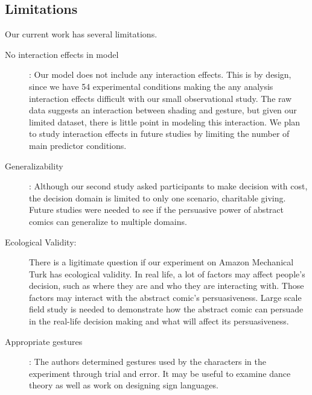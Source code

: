 \subsection{Limitations}
Our current work has several limitations.
\begin{description}
 \item[No interaction effects in model]: Our model does not include any interaction effects. This is by design, since we have 54 experimental conditions making the any analysis interaction effects difficult with our small observational study. The raw data suggests an interaction between shading and gesture, but given our limited dataset, there is little point in modeling this interaction. We plan to study interaction effects in future studies by limiting the number of main predictor conditions.
 \item[Generalizability]:  Although our second study asked participants to make decision with cost, the decision domain is limited to only one scenario, charitable giving. Future studies were needed to see if the persuasive power of abstract comics can generalize to multiple domains.

 \item[Ecological Validity:] There is a ligitimate question if our experiment on Amazon Mechanical Turk has ecological validity. In real life, a lot of factors may affect people's decision, such as where they are and who they are interacting with. Those factors may interact with the abstract comic's persuasiveness. Large scale field study is needed to demonstrate how the abstract comic can persuade in the real-life decision making and what will affect its persuasiveness.
 \item[Appropriate gestures]: The authors determined gestures used by the characters in the experiment through trial and error. It may be useful to examine dance theory as well as work on designing sign languages.
\end{description}
